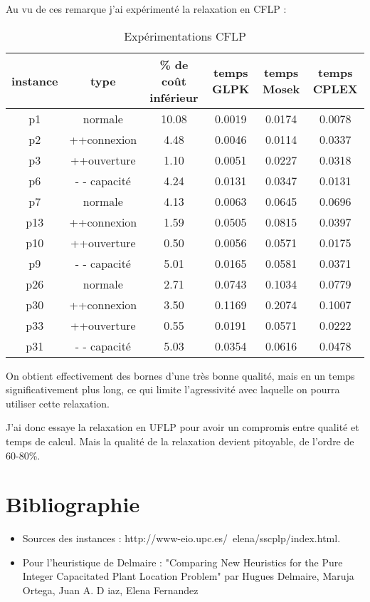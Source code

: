 \documentclass[12pt,a4paper]{article}
\begin{document}
Au vu de ces remarque j'ai expérimenté la relaxation en CFLP :
\begin{table}[!h]
\centering
\begin{tabular}{|c|c|c|c|c|c|}
  \hline
  instance & type & \% de coût inférieur & temps GLPK & temps Mosek & temps CPLEX \\
  \hline
	p1 & normale & 10.08 & 0.0019 & 0.0174 & 0.0078 \\
	p2 & ++connexion & 4.48 & 0.0046 & 0.0114 & 0.0337 \\
	p3 & ++ouverture & 1.10 & 0.0051 & 0.0227 & 0.0318 \\
	p6 & - - capacité & 4.24 & 0.0131 & 0.0347 & 0.0131 \\
  \hline
	p7 & normale & 4.13 & 0.0063 & 0.0645 & 0.0696 \\
	p13 & ++connexion & 1.59 & 0.0505 & 0.0815 & 0.0397 \\
	p10 & ++ouverture & 0.50 & 0.0056 & 0.0571 & 0.0175 \\
	p9 & - - capacité & 5.01 & 0.0165 & 0.0581 & 0.0371 \\
  \hline	
	p26 & normale & 2.71 & 0.0743 & 0.1034 & 0.0779 \\
	p30 & ++connexion & 3.50 & 0.1169 & 0.2074 & 0.1007 \\
	p33 & ++ouverture & 0.55 & 0.0191 & 0.0571 & 0.0222 \\
	p31 & - - capacité & 5.03 & 0.0354 & 0.0616 & 0.0478 \\
  \hline
\end{tabular}
\caption{Expérimentations CFLP}
\label{CFLP}
\end{table}

On obtient effectivement des bornes d'une très bonne qualité, mais en un temps significativement plus long, ce qui limite l’agressivité avec laquelle on pourra utiliser cette relaxation.

J'ai donc essaye la relaxation en UFLP pour avoir un compromis entre qualité et temps de calcul. Mais la qualité de la relaxation devient pitoyable, de l'ordre de 60-80\%.

\section*{Bibliographie}

\begin{itemize}
\item
Sources des instances : http://www-eio.upc.es/~elena/sscplp/index.html.\\
\item
Pour l'heuristique de Delmaire : "Comparing New Heuristics for the Pure Integer Capacitated Plant Location Problem" par Hugues Delmaire, Maruja Ortega, Juan A. D iaz, Elena Fernandez 
\end{itemize}
\end{document}
